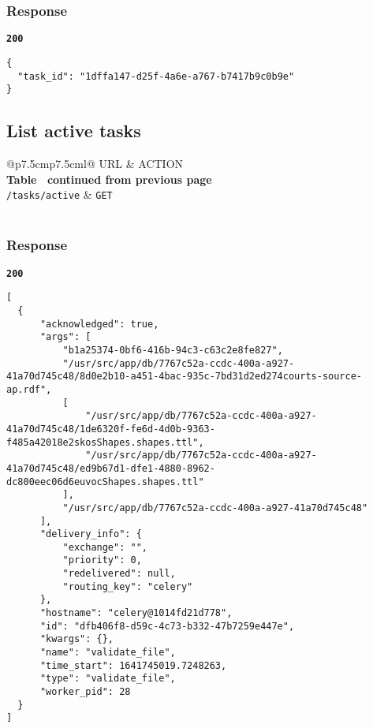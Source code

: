 \subsubsection{Response}
\textbf{\texttt{200}}
\begin{lstlisting}
{
  "task_id": "1dffa147-d25f-4a6e-a767-b7417b9c0b9e"
}
\end{lstlisting}


\subsection{List active tasks}

\begin{longtable}[c]{@{}p{7.5cm}p{7.5cm}l@{}}
  \toprule
  URL                    & ACTION                             \\* \midrule
  \endfirsthead
  \multicolumn{3}{c}%
  {{\bfseries Table \thetable\ continued from previous page}} \\
  \endhead
  \bottomrule
  \endfoot
  \endlastfoot
  \texttt{/tasks/active} & \texttt{GET}                       \\* \bottomrule
  \label{tab:rdf-validator-get-tasks}                         \\
\end{longtable}

\subsubsection{Response}
\textbf{\texttt{200}}
\begin{lstlisting}
[
  {
      "acknowledged": true,
      "args": [
          "b1a25374-0bf6-416b-94c3-c63c2e8fe827",
          "/usr/src/app/db/7767c52a-ccdc-400a-a927-41a70d745c48/8d0e2b10-a451-4bac-935c-7bd31d2ed274courts-source-ap.rdf",
          [
              "/usr/src/app/db/7767c52a-ccdc-400a-a927-41a70d745c48/1de6320f-fe6d-4d0b-9363-f485a42018e2skosShapes.shapes.ttl",
              "/usr/src/app/db/7767c52a-ccdc-400a-a927-41a70d745c48/ed9b67d1-dfe1-4880-8962-dc800eec06d6euvocShapes.shapes.ttl"
          ],
          "/usr/src/app/db/7767c52a-ccdc-400a-a927-41a70d745c48"
      ],
      "delivery_info": {
          "exchange": "",
          "priority": 0,
          "redelivered": null,
          "routing_key": "celery"
      },
      "hostname": "celery@1014fd21d778",
      "id": "dfb406f8-d59c-4c73-b332-47b7259e447e",
      "kwargs": {},
      "name": "validate_file",
      "time_start": 1641745019.7248263,
      "type": "validate_file",
      "worker_pid": 28
  }
]
\end{lstlisting}

